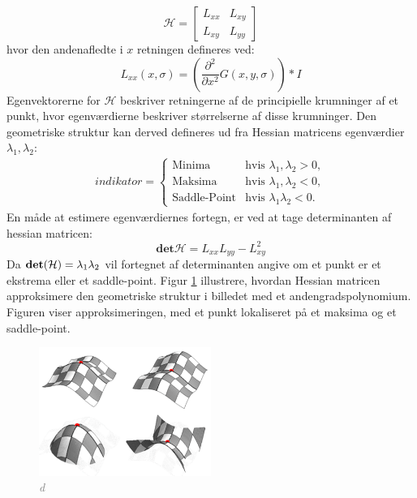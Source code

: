 \begin{equation}
\mathcal{H} = 
 \begin{bmatrix}
 	L_{xx} & L_{xy} \\
 	L_{xy} & L_{yy}
 \end{bmatrix}
 \label{hessianmatrixblob}
\end{equation}
hvor den andenafledte i $x$ retningen defineres ved:
\begin{equation}
L_{xx}(x, \sigma) = (\frac{\partial^2 }{\partial x^2 } G(x,y,\sigma)) * I
\label{lxx}
\end{equation}
Egenvektorerne for $\mathcal{H}$ beskriver retningerne af de principielle krumninger af et punkt, hvor egenværdierne beskriver størrelserne af disse krumninger. Den geometriske struktur kan derved defineres ud fra Hessian matricens egenværdier $\lambda_1, \lambda_2$:
\begin{equation}
\begin{split}
indikator = 
\begin{cases}
\text{Minima} & \text{hvis } \lambda_1, \lambda_2 > 0, \\
\text{Maksima}& \text{hvis } \lambda_1, \lambda_2 < 0,  \\
\text{Saddle-Point} & \text{hvis } \lambda_1 \lambda_2 < 0.
\end{cases}
\end{split}
\label{maxsurp}
\end{equation}
En måde at estimere egenværdiernes fortegn, er ved at tage determinanten af hessian matricen:
\begin{equation}
\textbf{det}\mathcal{H} = L_{xx}L_{yy}-L_{xy}^2
\label{detofhessian}
\end{equation}
Da $\bold{det}(\mathcal{H})=\lambda_1 \lambda_2$ vil fortegnet af determinanten angive om et punkt er et ekstrema eller et saddle-point. Figur \ref{fig:makssad} illustrere, hvordan Hessian matricen approksimere den geometriske struktur i billedet med et andengradspolynomium. Figuren viser approksimeringen, med et punkt lokaliseret på et maksima og et saddle-point.
\begin{figure}[H]
    \centering
    \includegraphics[width=0.50\textwidth]{fig/41.png}
    \vspace{-0.5em}
    \begin{center}
    \caption{\textcolor{gray}{\footnotesize \textit{
d   }}}
    \label{fig:makssad}
     \end{center}
  \end{figure}
